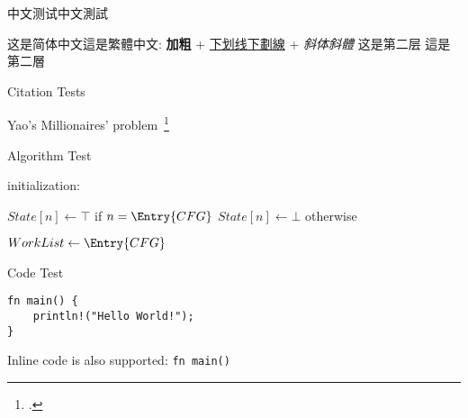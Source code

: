 \begin{frame}{中文测试中文測試}
	\begin{outline}
		\1 这是简体中文這是繁體中文: \textbf{加粗} + \underline{下划线下劃線} + \textit{斜体斜體}
			\2 这是第二层
			\2 這是第二層
	\end{outline}
\end{frame}

\begin{frame}{Citation Tests}
	\begin{outline}
		\1 Yao's Millionaires' problem~\footcite{10.5555/1382436.1382751}
	\end{outline}
\end{frame}

\begin{frame}{Algorithm Test}
    \begin{algorithm}[H]
      \SetAlgoLined
      \SetAlFnt{\tiny}
      \SetAlCapFnt{\normalsize}
      \SetAlCapNameFnt{\normalsize}
      \scriptsize
      initialization: \parbox[t]{\linewidth}{
        $State[n] \leftarrow \top$ if $n=\Entry{CFG}$\;
        $State[n] \leftarrow \bot$ otherwise\;}
    
      $WorkList \leftarrow \Entry{CFG}$\;
      \caption{Basic algorithm for Abstract Interpretation}
    \end{algorithm}
\end{frame}

\begin{frame}[fragile]{Code Test}
    \begin{verbatim}
fn main() {
    println!("Hello World!");
}
    \end{verbatim}
	\begin{outline}
		\1 Inline code is also supported: \texttt{fn main() { }}
	\end{outline}
\end{frame}

